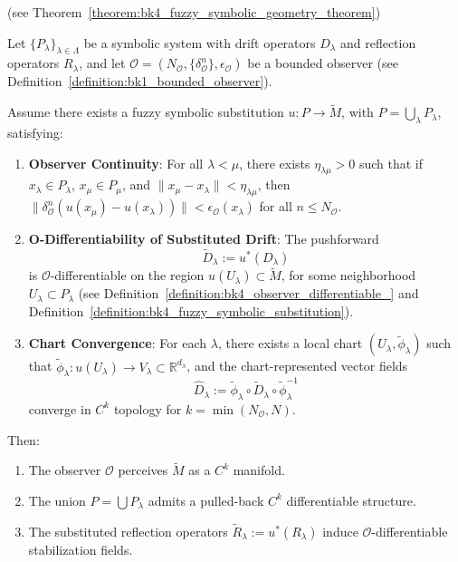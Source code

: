 \begin{theorem} 
\label{theorem:bk4_restated_fuzzy_symbolic_geometry_theorem} 
(see Theorem~\ref{theorem:bk4_fuzzy_symbolic_geometry_theorem})

Let \( \{P_\lambda\}_{\lambda \in \Lambda} \) be a symbolic system with drift operators \( D_\lambda \) and reflection operators \( R_\lambda \), and let \( \mathcal{O} = (N_\mathcal{O}, \{\delta^n_\mathcal{O}\}, \epsilon_\mathcal{O}) \) be a bounded observer (see Definition~\ref{definition:bk1_bounded_observer}). 

Assume there exists a fuzzy symbolic substitution \( u : P \to \tilde{M} \), with \( P = \bigcup_\lambda P_\lambda \), satisfying:

\begin{enumerate}
  \item \textbf{Observer Continuity}: For all \( \lambda < \mu \), there exists \( \eta_{\lambda\mu} > 0 \) such that if \( x_\lambda \in P_\lambda \), \( x_\mu \in P_\mu \), and \( \|x_\mu - x_\lambda\| < \eta_{\lambda\mu} \), then \( \|\delta^n_\mathcal{O}(u(x_\mu) - u(x_\lambda))\| < \epsilon_\mathcal{O}(x_\lambda) \) for all \( n \leq N_\mathcal{O} \).

  \item \textbf{O-Differentiability of Substituted Drift}: 
  The pushforward 
  \[
  \tilde{D}_\lambda := u^*(D_\lambda)
  \]
  is \( \mathcal{O} \)-differentiable on the region \( u(U_\lambda) \subset \tilde{M} \), 
  for some neighborhood \( U_\lambda \subset P_\lambda \) (see Definition~\ref{definition:bk4_observer_differentiable_} and Definition~\ref{definition:bk4_fuzzy_symbolic_substitution}).

  \item \textbf{Chart Convergence}: For each \( \lambda \), there exists a local chart \( (U_\lambda, \tilde{\phi}_\lambda) \) such that \( \tilde{\phi}_\lambda : u(U_\lambda) \to V_\lambda \subset \mathbb{R}^{d_\lambda} \), and the chart-represented vector fields 
  \[
  \hat{D}_\lambda := \tilde{\phi}_\lambda \circ \tilde{D}_\lambda \circ \tilde{\phi}_\lambda^{-1}
  \]
  converge in \( C^k \) topology for \( k = \min(N_\mathcal{O}, N) \).
\end{enumerate}

Then:
\begin{enumerate}
  \item The observer \( \mathcal{O} \) perceives \( \tilde{M} \) as a \( C^k \) manifold.

  \item The union \( P = \bigcup P_\lambda \) admits a pulled-back \( C^k \) differentiable structure.

  \item The substituted reflection operators \( \tilde{R}_\lambda := u^*(R_\lambda) \) induce \( \mathcal{O} \)-differentiable stabilization fields.
\end{enumerate}
\end{theorem}

